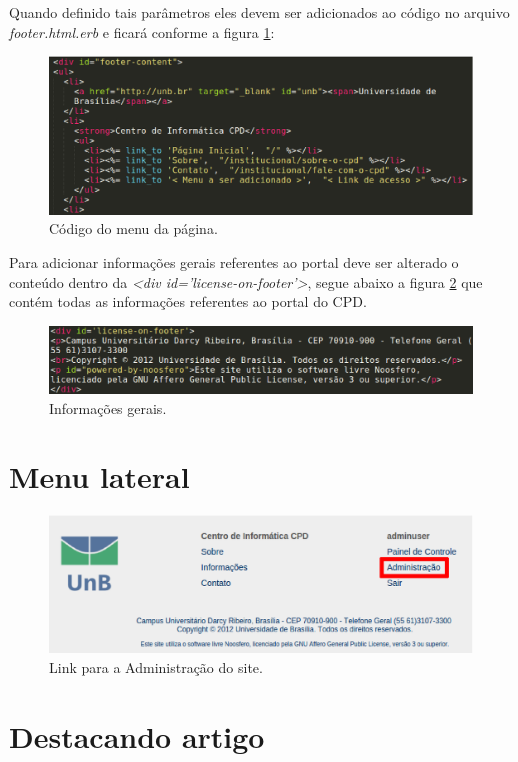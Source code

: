 Quando definido tais parâmetros eles devem ser adicionados ao código no arquivo \emph{footer.html.erb} e ficará conforme a figura \ref{fig:codMenu}:

\begin{figure}[h]
     \centering
       \includegraphics[keepaspectratio=true,scale=0.49]{figuras/footerMenu.eps}
     \caption{Código do menu da página.}
     \label{fig:codMenu}
\end{figure}

Para adicionar informações gerais referentes ao portal deve ser alterado o conteúdo dentro da \emph{<div id='license-on-footer'>}, segue abaixo a figura \ref{fig:infGeral} que contém todas as informações referentes ao portal do CPD.

\begin{figure}[h]
     \centering
       \includegraphics[keepaspectratio=true,scale=0.49]{figuras/informacoesGeraisRodape.eps}
     \caption{Informações gerais.}
     \label{fig:infGeral}
\end{figure}

\section{Menu lateral}

\begin{figure}[h]
     \centering
       \includegraphics[keepaspectratio=true,scale=0.49]{figuras/linkAdmin.eps}
     \caption{Link para a Administração do site.}
     \label{fig:linkAdmin}
\end{figure}

\section{Destacando artigo}
